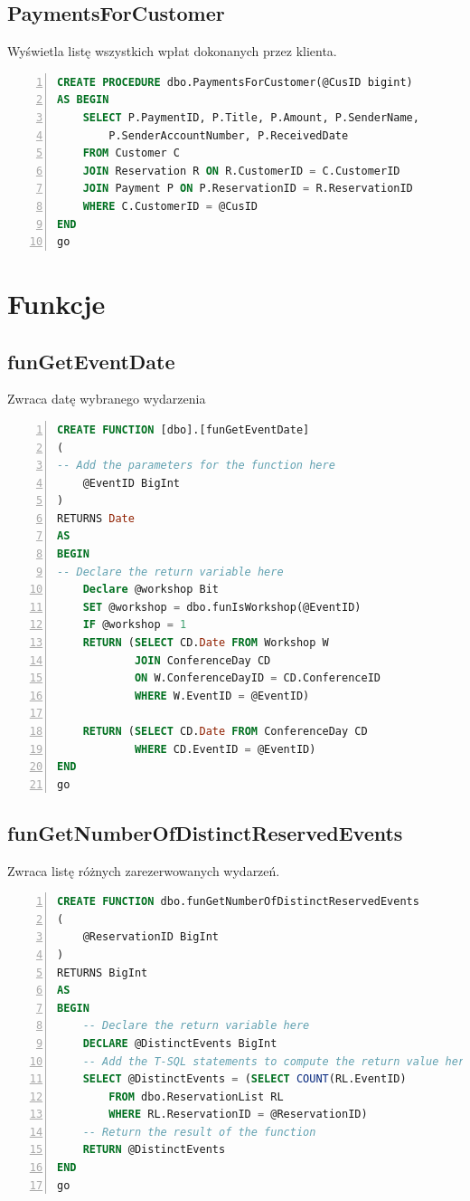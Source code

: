 \documentclass[]{article}
\begin{document}
	\subsection{PaymentsForCustomer}
	Wyświetla listę wszystkich wpłat dokonanych przez klienta.
	\begin{lstlisting}[language=SQL,
						showspaces=false,
						basicstyle=\ttfamily,
						numbers=left,
						numberstyle=\tiny,
						backgroundcolor=\color{lightg},
						keywordstyle=\color{lightblue},
						commentstyle=\color{gray}]
CREATE PROCEDURE dbo.PaymentsForCustomer(@CusID bigint)
AS BEGIN
	SELECT P.PaymentID, P.Title, P.Amount, P.SenderName,
		P.SenderAccountNumber, P.ReceivedDate
	FROM Customer C
	JOIN Reservation R ON R.CustomerID = C.CustomerID
	JOIN Payment P ON P.ReservationID = R.ReservationID
	WHERE C.CustomerID = @CusID
END
go
	\end{lstlisting}

\section{Funkcje}
	\subsection{funGetEventDate}
	Zwraca datę wybranego wydarzenia
	\begin{lstlisting}[language=SQL,
						showspaces=false,
						basicstyle=\ttfamily,
						numbers=left,
						numberstyle=\tiny,
						backgroundcolor=\color{lightg},
						keywordstyle=\color{lightblue},
						commentstyle=\color{gray}]
CREATE FUNCTION [dbo].[funGetEventDate]
(
-- Add the parameters for the function here
	@EventID BigInt
)
RETURNS Date
AS
BEGIN
-- Declare the return variable here
	Declare @workshop Bit
	SET @workshop = dbo.funIsWorkshop(@EventID)
	IF @workshop = 1
	RETURN (SELECT CD.Date FROM Workshop W
			JOIN ConferenceDay CD
			ON W.ConferenceDayID = CD.ConferenceID
			WHERE W.EventID = @EventID)
	
	RETURN (SELECT CD.Date FROM ConferenceDay CD
			WHERE CD.EventID = @EventID)
END
go
	\end{lstlisting}
	
	\subsection{funGetNumberOfDistinctReservedEvents}
	Zwraca listę różnych zarezerwowanych wydarzeń.
	\begin{lstlisting}[language=SQL,
						showspaces=false,
						basicstyle=\ttfamily,
						numbers=left,
						numberstyle=\tiny,
						backgroundcolor=\color{lightg},
						keywordstyle=\color{lightblue},
						commentstyle=\color{gray}]
CREATE FUNCTION dbo.funGetNumberOfDistinctReservedEvents
(
	@ReservationID BigInt
)
RETURNS BigInt
AS
BEGIN
	-- Declare the return variable here
	DECLARE @DistinctEvents BigInt
	-- Add the T-SQL statements to compute the return value here
	SELECT @DistinctEvents = (SELECT COUNT(RL.EventID)
		FROM dbo.ReservationList RL
		WHERE RL.ReservationID = @ReservationID)
	-- Return the result of the function
	RETURN @DistinctEvents
END
go
	\end{lstlisting}
	
\end{document}
